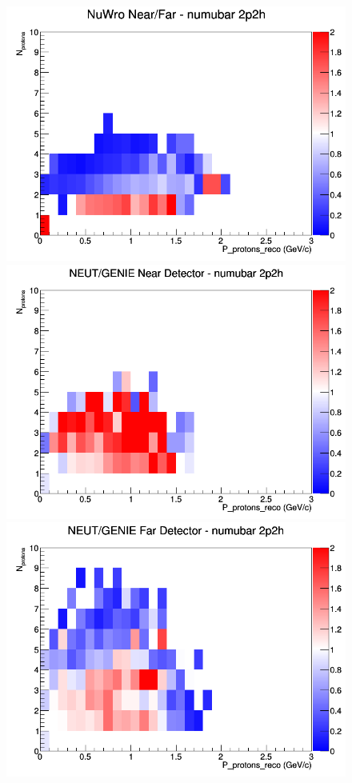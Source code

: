 \begin{figure}[h]
\endminipage
{}
\includegraphics[width=\linewidth]{eff_N_P/FGT/protons/ratios/2p2h_NuWro_numubar_NF_N_P.png}
\endminipage
\newline
{}
\includegraphics[width=\linewidth]{eff_N_P/FGT/protons/ratios/2p2h_NEUT_GENIE_numubar_near_N_P.png}
\endminipage
{}
\includegraphics[width=\linewidth]{eff_N_P/FGT/protons/ratios/2p2h_NEUT_GENIE_numubar_far_N_P.png}

\end{figure}
